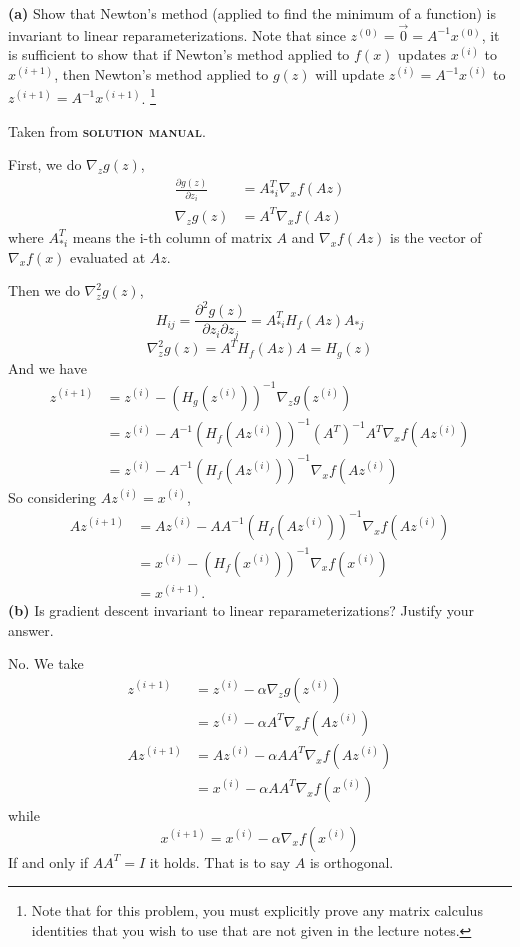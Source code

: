 \documentclass[11pt]{article}
\renewcommand\part[1]{\vspace{.10in}\textbf{(#1)  }}
\begin{document}
\part{a} Show that Newton's method (applied to find the minimum of a function) is invariant to linear reparameterizations. Note that since $z^{(0)} = \overrightarrow{0} = A^{-1}x^{(0)}$, it is sufficient to show that if Newton's method applied to $f(x)$ updates $x^{(i)}$ to $x^{(i+1)}$, then Newton's method applied to $g(z)$ will update $z^{(i)} = A^{-1}x^{(i)}$ to $z^{(i+1)} = A^{-1}x^{(i+1)}$. \footnote{Note that for this problem, you must explicitly prove any matrix calculus identities that you wish to use that are not given in the lecture notes.}

Taken from \textsc{\textbf{solution manual}}.

First, we do $\nabla_z g(z)$,
\begin{align*}
  \frac{\partial g(z)}{\partial z_i} & =  A_{*i}^T\nabla_xf(Az)\\
  \nabla_z g(z) & = A^T\nabla_x f(Az)
\end{align*}
where $A_{*i}^T$ means the i-th column of matrix $A$ and $\nabla_x f(Az)$ is the vector of $\nabla_x f(x)$ evaluated at $Az$.

Then we do $\nabla_z^2 g(z)$,
$$  H_{ij} = \frac{\partial^2 g(z)}{\partial z_i\partial z_j}  =  A_{*i}^TH_f(Az)A_{*j}$$
$$ \nabla_z^2 g(z) = A^TH_f(Az)A = H_g(z)$$
And we have
\begin{align*}
  z^{(i+1)} & = z^{(i)}-(H_g(z^{(i)}))^{-1}\nabla_z g(z^{(i)}) \\
  ~ & = z^{(i)}-A^{-1}(H_f(Az^{(i)}))^{-1}(A^T)^{-1}A^T\nabla_xf(Az^{(i)})\\
  ~ & = z^{(i)}-A^{-1}(H_f(Az^{(i)}))^{-1}\nabla_xf(Az^{(i)})
\end{align*}
So considering $Az^{(i)} = x^{(i)}$,
\begin{align*}
Az^{(i+1)} & = Az^{(i)}-AA^{-1}(H_f(Az^{(i)}))^{-1}\nabla_xf(Az^{(i)})\\
~ & = x^{(i)}-(H_f(x^{(i)}))^{-1}\nabla_xf(x^{(i)})\\
~ & = x^{(i+1)}.
\end{align*}
\part{b}Is gradient descent invariant to linear reparameterizations? Justify your answer.

No. We take
\begin{align*}
z^{(i+1)}  & = z^{(i)}-\alpha \nabla_z g(z^{(i)})\\
~ & = z^{(i)}-\alpha A^T\nabla_x f(Az^{(i)})\\
Az^{(i+1)} & = Az^{(i)}-\alpha AA^T\nabla_x f(Az^{(i)})\\
~ & = x^{(i)}-\alpha AA^T\nabla_x f(x^{(i)})
\end{align*}
while $$x^{(i+1)} = x^{(i)}-\alpha \nabla_x f(x^{(i)})$$
If and only if $AA^T=I$ it holds. That is to say $A$ is orthogonal.
\end{document}
